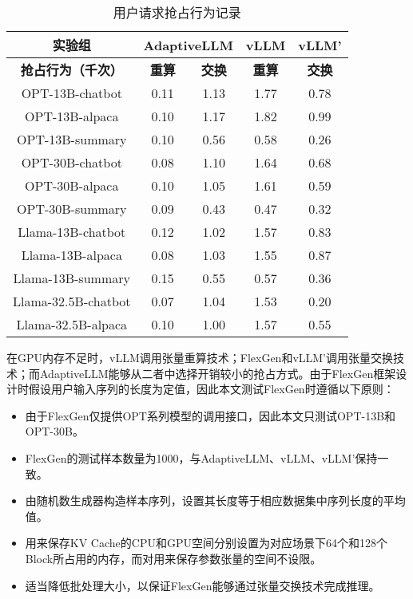 \begin{table}[H]
  \centering
  \caption{用户请求抢占行为记录}
  \label{Table:用户请求抢占行为记录}
  \renewcommand{\arraystretch}{1.17}
  \small
  \begin{tabular}{c c c c c}
    \toprule
    \textbf{实验组} & \multicolumn{2}{c}{\textbf{AdaptiveLLM}} & \textbf{vLLM} & \textbf{vLLM'} \\
    \midrule
    \textbf{抢占行为（千次）} & \textbf{重算} & \textbf{交换} & \textbf{重算} & \textbf{交换} \\
    \midrule
    OPT-13B-chatbot & 0.11 & 1.13 & 1.77 & 0.78 \\
    OPT-13B-alpaca & 0.10 & 1.17 & 1.82 & 0.99 \\
    OPT-13B-summary & 0.10 & 0.56 & 0.58 & 0.26 \\
    OPT-30B-chatbot & 0.08 & 1.10 & 1.64 & 0.68 \\
    OPT-30B-alpaca & 0.10 & 1.05 & 1.61 & 0.59 \\
    OPT-30B-summary & 0.09 & 0.43 & 0.47 & 0.32 \\
    Llama-13B-chatbot & 0.12 & 1.02 & 1.57 & 0.83 \\
    Llama-13B-alpaca & 0.08 & 1.03 & 1.55 & 0.87 \\
    Llama-13B-summary & 0.15 & 0.55 & 0.57 & 0.36 \\
    Llama-32.5B-chatbot & 0.07 & 1.04 & 1.53 & 0.20 \\
    Llama-32.5B-alpaca & 0.10 & 1.00 & 1.57 & 0.55 \\
    \bottomrule
  \end{tabular}
\end{table}

在GPU内存不足时，vLLM调用张量重算技术；FlexGen和vLLM'调用张量交换技术；而AdaptiveLLM能够从二者中选择开销较小的抢占方式。由于FlexGen框架设计时假设用户输入序列的长度为定值，因此本文测试FlexGen时遵循以下原则：

\begin{itemize}
  \item 由于FlexGen仅提供OPT系列模型的调用接口，因此本文只测试OPT-13B和OPT-30B。
  \item FlexGen的测试样本数量为1000，与AdaptiveLLM、vLLM、vLLM’保持一致。
  \item 由随机数生成器构造样本序列，设置其长度等于相应数据集中序列长度的平均值。
  \item 用来保存KV Cache的CPU和GPU空间分别设置为对应场景下64个和128个Block所占用的内存，而对用来保存参数张量的空间不设限。
  \item 适当降低批处理大小，以保证FlexGen能够通过张量交换技术完成推理。
\end{itemize}

